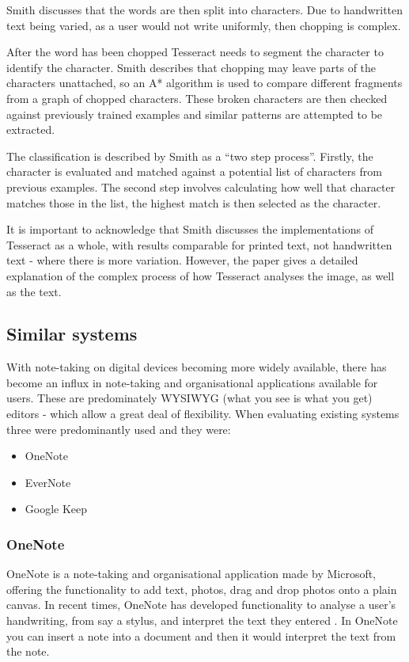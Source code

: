 Smith discusses that the words are then split into characters. Due to handwritten text being varied, as a user would not write uniformly, then chopping is complex.

After the word has been chopped Tesseract needs to segment the character to identify the character. Smith describes that chopping may leave parts of the characters unattached, so an A* algorithm is used to compare different fragments from a graph of chopped characters. These broken characters are then checked against previously trained examples and similar patterns are attempted to be extracted.

The classification is described by Smith as a ``two step process''. Firstly, the character is evaluated and matched against a potential list of characters from previous examples. The second step involves calculating how well that character matches those in the list, the highest match is then selected as the character.

It is important to acknowledge that Smith discusses the implementations of Tesseract as a whole, with results comparable for printed text, not handwritten text - where there is more variation. However, the paper gives a detailed explanation of the complex process of how Tesseract analyses the image, as well as the text.

\subsection{Similar systems}
With note-taking on digital devices becoming more widely available, there has become an influx in note-taking and organisational applications available for users. These are predominately WYSIWYG (what you see is what you get) editors - which allow a great deal of flexibility. When evaluating existing systems three were predominantly used and they were:
\begin{itemize}
  \item OneNote
  \item EverNote
  \item Google Keep
\end{itemize}

\subsubsection{OneNote}
OneNote \cite{citeulike:onenote} is a note-taking and organisational application made by Microsoft, offering the functionality to add text, photos, drag and drop photos onto a plain canvas. In recent times, OneNote has developed functionality to analyse a user's handwriting, from say a stylus, and interpret the text they entered \cite{citeulike:14014236}. In OneNote you can insert a note into a document and then it would interpret the text from the note.

